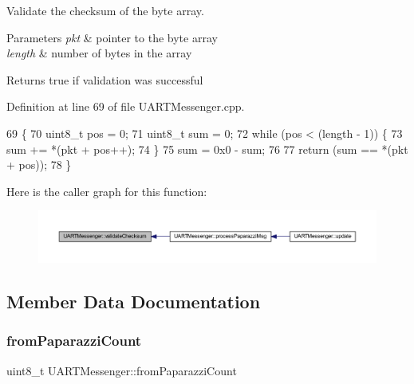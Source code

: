 Validate the checksum of the byte array. 


\begin{DoxyParams}{Parameters}
{\em pkt} & pointer to the byte array \\
\hline
{\em length} & number of bytes in the array\\
\hline
\end{DoxyParams}
\begin{DoxyReturn}{Returns}
true if validation was successful 
\end{DoxyReturn}


Definition at line 69 of file U\+A\+R\+T\+Messenger.\+cpp.


\begin{DoxyCode}
69                                                                              \{
70     uint8\_t pos = 0;
71     uint8\_t sum = 0;
72     \textcolor{keywordflow}{while} (pos < (length - 1)) \{
73         sum += *(pkt + pos++);
74     \}
75     sum = 0x0 - sum;
76 
77     \textcolor{keywordflow}{return} (sum == *(pkt + pos));
78 \}
\end{DoxyCode}
Here is the caller graph for this function\+:\nopagebreak
\begin{figure}[H]
\begin{center}
\leavevmode
\includegraphics[width=350pt]{class_u_a_r_t_messenger_a8e90d75bc44daee10b5d6cf70e1c1fb4_icgraph}
\end{center}
\end{figure}


\subsection{Member Data Documentation}
\mbox{\label{class_u_a_r_t_messenger_a72ecf1c51d6a28c582fff9fd454145dd}} 
\subsubsection{\texorpdfstring{from\+Paparazzi\+Count}{fromPaparazziCount}}
{\footnotesize\ttfamily uint8\+\_\+t U\+A\+R\+T\+Messenger\+::from\+Paparazzi\+Count\hspace{0.3cm}{\ttfamily [private]}}




